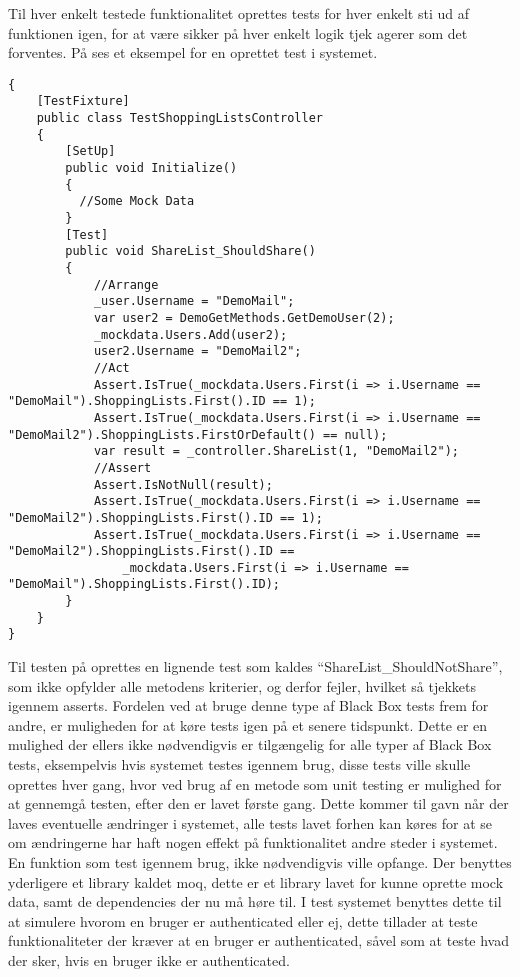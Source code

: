 Til hver enkelt testede funktionalitet oprettes tests for hver enkelt sti ud af funktionen igen, for at være sikker på hver enkelt logik tjek agerer som det forventes.
På  ses et eksempel for en oprettet test i systemet.

\begin{lstlisting}[caption="En test for ``ShareList'' metodern i ``ShoppingListController''\, heri tjekkes hvorom den bruger listen deles med\, får listen sat ind på brugerens liste over shoppinglister.", label=lsttest]
{
    [TestFixture]
    public class TestShoppingListsController
    {
		[SetUp]
        public void Initialize()
        {
          //Some Mock Data
        }
        [Test]
        public void ShareList_ShouldShare()
        {
            //Arrange
            _user.Username = "DemoMail";
            var user2 = DemoGetMethods.GetDemoUser(2);
            _mockdata.Users.Add(user2); 
            user2.Username = "DemoMail2";
            //Act
            Assert.IsTrue(_mockdata.Users.First(i => i.Username == "DemoMail").ShoppingLists.First().ID == 1);
            Assert.IsTrue(_mockdata.Users.First(i => i.Username == "DemoMail2").ShoppingLists.FirstOrDefault() == null);
            var result = _controller.ShareList(1, "DemoMail2");
            //Assert
            Assert.IsNotNull(result);
            Assert.IsTrue(_mockdata.Users.First(i => i.Username == "DemoMail2").ShoppingLists.First().ID == 1);
            Assert.IsTrue(_mockdata.Users.First(i => i.Username == "DemoMail2").ShoppingLists.First().ID == 
                _mockdata.Users.First(i => i.Username == "DemoMail").ShoppingLists.First().ID);
        }
    }
}        
\end{lstlisting}
Til testen på  oprettes en lignende test som kaldes ``ShareList\_ShouldNotShare'', som ikke opfylder alle metodens kriterier, og derfor fejler, hvilket så tjekkets igennem asserts.
Fordelen ved at bruge denne type af Black Box tests frem for andre, er muligheden for at køre tests igen på et senere tidspunkt.
Dette er en mulighed der ellers ikke nødvendigvis er tilgængelig for alle typer af Black Box tests, eksempelvis hvis systemet testes igennem brug, disse tests ville skulle oprettes hver gang, hvor ved brug af en metode som unit testing er mulighed for at gennemgå testen, efter den er lavet første gang.
Dette kommer til gavn når der laves eventuelle ændringer i systemet, alle tests lavet forhen kan køres for at se om ændringerne har haft nogen effekt på funktionalitet andre steder i systemet. 
En funktion som test igennem brug, ikke nødvendigvis ville opfange.
Der benyttes yderligere et library kaldet moq, dette er et library lavet for kunne oprette mock data, samt de dependencies der nu må høre til.
I test systemet benyttes dette til at simulere hvorom en bruger er authenticated eller ej, dette tillader at teste funktionaliteter der kræver at en bruger er authenticated, såvel som at teste hvad der sker, hvis en bruger ikke er authenticated.
